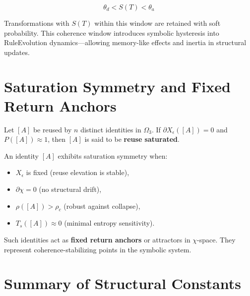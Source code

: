 \begin{definition}
\begin{equation} \label{eq:coherence-window}
\theta_d < S(T) < \theta_a
\end{equation}
\end{definition}

Transformations with $S(T)$ within this window are retained with soft probability. This coherence window introduces symbolic hysteresis into RuleEvolution dynamics—allowing memory-like effects and inertia in structural updates.

\section{Saturation Symmetry and Fixed Return Anchors} \label{saturation-symmetry-and-fixed-return-anchors}

Let $[A]$ be reused by $n$ distinct identities in $\Omega_3$. If $\partial X_\epsilon([A]) = 0$ and $P([A]) \approx 1$, then $[A]$ is said to be \textbf{reuse saturated}.

\begin{definition}
An identity $[A]$ exhibits saturation symmetry when:
\begin{itemize}
    \item $X_\epsilon$ is fixed (reuse elevation is stable),
    \item $\partial\chi = 0$ (no structural drift),
    \item $\rho([A]) > \rho_c$ (robust against collapse),
    \item $T_s([A]) \approx 0$ (minimal entropy sensitivity).
\end{itemize}
\end{definition}

Such identities act as \textbf{fixed return anchors} or attractors in $\chi$-space. They represent coherence-stabilizing points in the symbolic system.

\section{Summary of Structural Constants} \label{summary-of-structural-constants}

